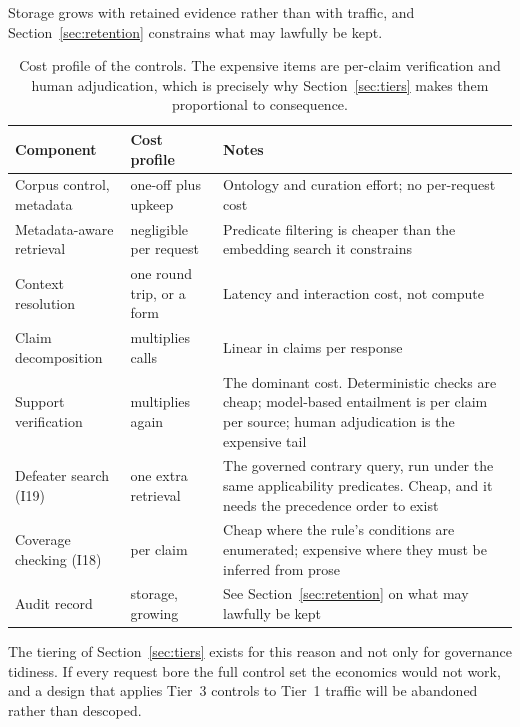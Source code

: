 Storage grows with retained evidence rather than with traffic, and
Section~\ref{sec:retention} constrains what may lawfully be kept.

\begin{table}[ht]
  \centering
  \small
  \begin{tabular}{@{}>{\raggedright\arraybackslash}p{3.9cm}>{\raggedright\arraybackslash}p{3.1cm}>{\raggedright\arraybackslash}p{6.6cm}@{}}
    \toprule
    Component & Cost profile & Notes \\
    \midrule
    Corpus control, metadata
      & one-off plus upkeep
      & Ontology and curation effort; no per-request cost \\
    \addlinespace
    Metadata-aware retrieval
      & negligible per request
      & Predicate filtering is cheaper than the embedding search it constrains \\
    \addlinespace
    Context resolution
      & one round trip, or a form
      & Latency and interaction cost, not compute \\
    \addlinespace
    Claim decomposition
      & multiplies calls
      & Linear in claims per response \\
    \addlinespace
    Support verification
      & multiplies again
      & The dominant cost. Deterministic checks are cheap; model-based
        entailment is per claim per source; human adjudication is the expensive tail \\
    \addlinespace
    Defeater search (I19)
      & one extra retrieval
      & The governed contrary query, run under the same applicability predicates.
        Cheap, and it needs the precedence order to exist \\
    \addlinespace
    Coverage checking (I18)
      & per claim
      & Cheap where the rule's conditions are enumerated; expensive where they must be
        inferred from prose \\
    \addlinespace
    Audit record
      & storage, growing
      & See Section~\ref{sec:retention} on what may lawfully be kept \\
    \bottomrule
  \end{tabular}
  \caption{Cost profile of the controls. The expensive items are per-claim
    verification and human adjudication, which is precisely why
    Section~\ref{sec:tiers} makes them proportional to consequence.}
  \label{tab:cost}
\end{table}

The tiering of Section~\ref{sec:tiers} exists for this reason and not only for
governance tidiness. If every request bore the full control set the economics would
not work, and a design that applies Tier~3 controls to Tier~1 traffic will be
abandoned rather than descoped.

